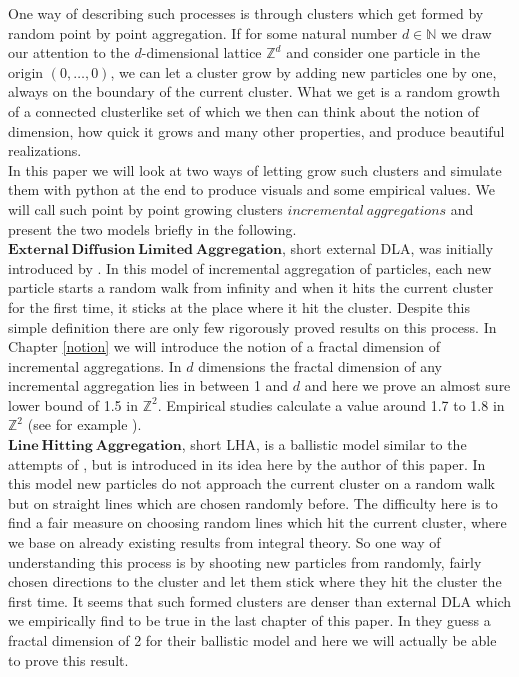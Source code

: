 \documentclass[12pt,a4paper]{scrartcl}
\newcommand{\Z}{\mathbb{Z}} %
\newcommand{\N}{\mathbb{N}} %
\newcommand{\1}{\mathbbm{1}}
\theoremstyle{definition}
\numberwithin{equation}{section}
\begin{document}
	\noindent One way of describing such processes is through clusters which get formed by random point by point aggregation. If for some natural number $d\in\N$ we draw our attention to the $d$-dimensional lattice $\Z^d$ and consider one particle in the origin $(0,\dots,0)$, we can let a cluster grow by adding new particles one by one, always on the boundary of the current cluster. What we get is a random growth of a connected clusterlike set of which we then can think about the notion of dimension, how quick it grows and many other properties, and produce beautiful realizations. \\
	
	\noindent In this paper we will look at two ways of letting grow such clusters and simulate them with python at the end to produce visuals and some empirical values. We will call such point by point growing clusters $\mathit{incremental\ aggregations}$ and present the two models briefly in the following.\\

	\noindent $\mathbf{External\ Diffusion\ Limited\ Aggregation}$, short external DLA, was initially introduced by \cite[Witten and Sander, 1983]{wittensander}. In this model of incremental aggregation of particles, each new particle starts a random walk from infinity and when it hits the current cluster for the first time, it sticks at the place where it hit the cluster. Despite this simple definition there are only few rigorously proved results on this process. In Chapter \ref{notion} we will introduce the notion of a fractal dimension of incremental aggregations. In $d$ dimensions the fractal dimension of any incremental aggregation lies in between 1 and $d$ and here we prove an almost sure lower bound of 1.5 in $\Z^2$. Empirical studies calculate a value around 1.7 to 1.8 in $\Z^2$ (see for example \cite{magnetic}).  \\
	
	\noindent $\mathbf{Line\ Hitting\ Aggregation}$, short LHA, is a ballistic model similar to the attempts of \cite{ballistic}, but is introduced in its idea here by the author of this paper. In this model new particles do not approach the current cluster on a random walk but on straight lines which are chosen randomly before. The difficulty here is to find a fair measure on choosing random lines which hit the current cluster, where we base on already existing results from integral theory. So one way of understanding this process is by shooting new particles from randomly, fairly chosen directions to the cluster and let them stick where they hit the cluster the first time. It seems that such formed clusters are denser than external DLA which we empirically find to be true in the last chapter of this paper. In \cite{ballistic} they guess a fractal dimension of 2 for their ballistic model and here we will actually be able to prove this result. \\
	
\end{document}
